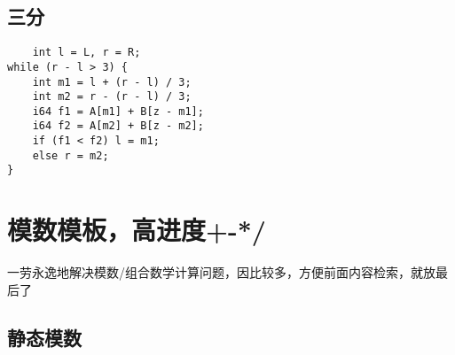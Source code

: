 \documentclass[UTF8]{ctexart}
\begin{document}
\subsection{三分}
\begin{lstlisting}
    int l = L, r = R;
while (r - l > 3) {
    int m1 = l + (r - l) / 3;
    int m2 = r - (r - l) / 3;
    i64 f1 = A[m1] + B[z - m1];
    i64 f2 = A[m2] + B[z - m2];
    if (f1 < f2) l = m1;
    else r = m2;
}
\end{lstlisting}
\section{模数模板，高进度+-*/}
一劳永逸地解决模数/组合数学计算问题，因比较多，方便前面内容检索，就放最后了
\subsection{静态模数}
\end{document}
